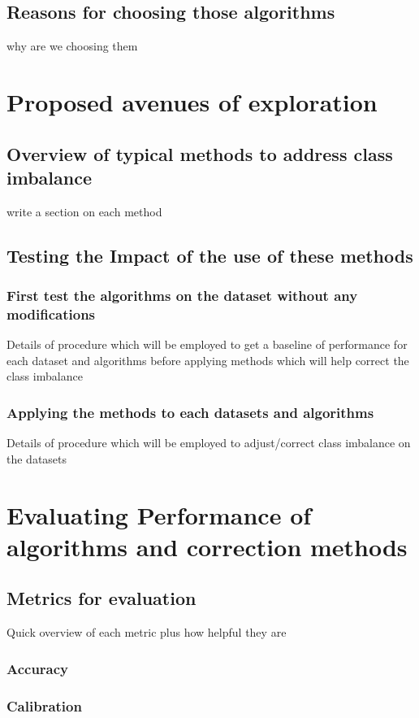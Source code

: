 \subsection{Reasons for choosing those algorithms}
why are we choosing them

\section{Proposed avenues of exploration}
\subsection{Overview of typical methods to address class imbalance}
write a section on each method 
\subsection{Testing the Impact of the use of these methods}
\subsubsection{First test the algorithms on the dataset without any modifications}
Details of procedure which will be employed to get a baseline of performance for each dataset and algorithms before applying methods which will help correct the class imbalance

\subsubsection{Applying the methods to each datasets and algorithms}
Details of procedure which will be employed to adjust/correct class imbalance on the datasets


\section{Evaluating Performance of algorithms and correction methods}

\subsection{Metrics for evaluation}
Quick overview of each metric plus how helpful they are 
\subsubsection{Accuracy}
\subsubsection{Calibration}
